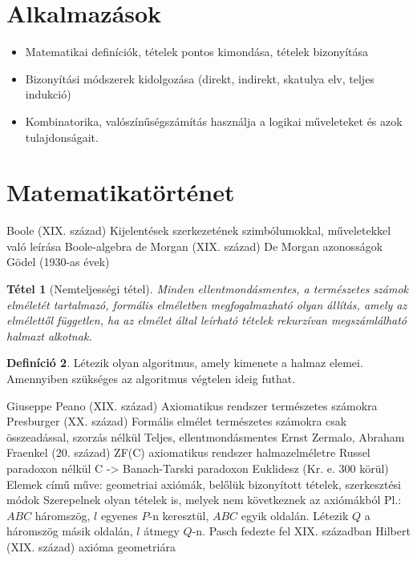 \documentclass[twoside,12pt]{report}
\newtheorem{theorem}{Tétel}[section]
\theoremstyle{definition}
\newtheorem{definition}[theorem]{Definíció}
\begin{document}
\section{Alkalmazások}
	\begin{itemize}
		\item Matematikai definíciók, tételek pontos kimondása, tételek bizonyítása
		\item Bizonyítási módszerek kidolgozása (direkt, indirekt, skatulya elv, teljes indukció)
		\item Kombinatorika, valószínűségszámítás használja a logikai műveleteket és azok tulajdonságait.
	\end{itemize}
\section{Matematikatörténet}
	\begin{outline}
		\1 Boole (XIX. század)
			\2 Kijelentések szerkezetének szimbólumokkal, műveletekkel való leírása
			\2 Boole-algebra
		\1 de Morgan (XIX. század)
			\2 De Morgan azonosságok
		\1 Gödel (1930-as évek)
			\2[]
			\begin{theorem}[Nemteljességi tétel]
				Minden ellentmondásmentes, a természetes számok elméletét tartalmazó, formális elméletben megfogalmazható olyan állítás, amely az elmélettől független, ha az elmélet által leírható tételek rekurzívan megszámlálható halmazt alkotnak.
			\end{theorem}
			\2[] 
			\begin{definition}
				Létezik olyan algoritmus, amely kimenete a halmaz elemei. Amennyiben szükséges az algoritmus végtelen ideig futhat.
			\end{definition}
		\1 Giuseppe Peano (XIX. század)
			\2 Axiomatikus rendszer természetes számokra
		\1 Presburger (XX. század)
			\2 Formális elmélet természetes számokra csak összeadással, szorzás nélkül
			\2 Teljes, ellentmondásmentes
		\1 Ernst Zermalo, Abraham Fraenkel (20. század)
			\2 ZF(C) axiomatikus rendszer halmazelméletre Russel paradoxon nélkül
			\2 C -> Banach-Tarski paradoxon
		\1 Euklidesz (Kr. e. 300 körül)
			\2 Elemek című műve: geometriai axiómák, belőlük bizonyított tételek, szerkesztési módok
			\2 Szerepelnek olyan tételek is, melyek nem következnek az axiómákból
			\2 Pl.:  $ABC$ háromszög, $l$ egyenes $P$-n keresztül, $ABC$ egyik oldalán. Létezik $Q$ a háromszög másik oldalán, $l$ átmegy $Q$-n.
				\3 Pasch fedezte fel XIX. században
		\1 Hilbert (XIX. század)
			 axióma geometriára
	\end{outline}
\end{document}
